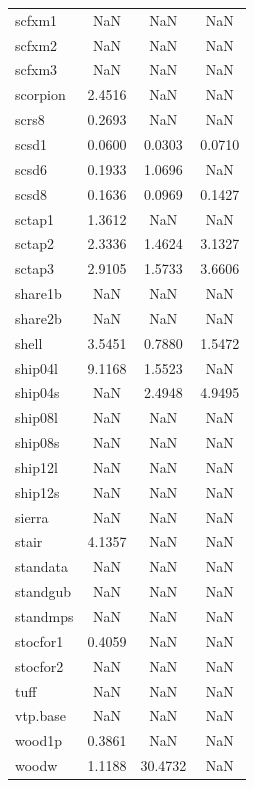 \begin{longtable}{lccc}
scfxm1   &     NaN &     NaN &    NaN \\
scfxm2   &     NaN &     NaN &    NaN \\
scfxm3   &     NaN &     NaN &    NaN \\
scorpion &  2.4516 &     NaN &    NaN \\
scrs8    &  0.2693 &     NaN &    NaN \\
scsd1    &  0.0600 &  0.0303 & 0.0710 \\
scsd6    &  0.1933 &  1.0696 &    NaN \\
scsd8    &  0.1636 &  0.0969 & 0.1427 \\
sctap1   &  1.3612 &     NaN &    NaN \\
sctap2   &  2.3336 &  1.4624 & 3.1327 \\
sctap3   &  2.9105 &  1.5733 & 3.6606 \\
share1b  &     NaN &     NaN &    NaN \\
share2b  &     NaN &     NaN &    NaN \\
shell    &  3.5451 &  0.7880 & 1.5472 \\
ship04l  &  9.1168 &  1.5523 &    NaN \\
ship04s  &     NaN &  2.4948 & 4.9495 \\
ship08l  &     NaN &     NaN &    NaN \\
ship08s  &     NaN &     NaN &    NaN \\
ship12l  &     NaN &     NaN &    NaN \\
ship12s  &     NaN &     NaN &    NaN \\
sierra   &     NaN &     NaN &    NaN \\
stair    &  4.1357 &     NaN &    NaN \\
standata &     NaN &     NaN &    NaN \\
standgub &     NaN &     NaN &    NaN \\
standmps &     NaN &     NaN &    NaN \\
stocfor1 &  0.4059 &     NaN &    NaN \\
stocfor2 &     NaN &     NaN &    NaN \\
tuff     &     NaN &     NaN &    NaN \\
vtp.base &     NaN &     NaN &    NaN \\
wood1p   &  0.3861 &     NaN &    NaN \\
woodw    &  1.1188 & 30.4732 &    NaN \\
\end{longtable}

